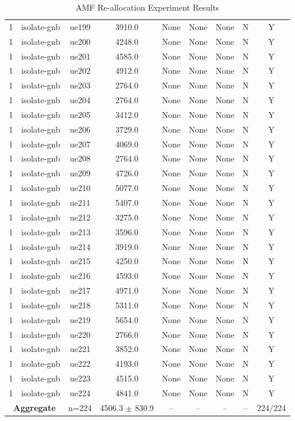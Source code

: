 \begin{table}[ht]
\begin{tabular}{|c|c|c|c|c|c|c|c|c|}
1 & isolate-gnb & ue199 & 3910.0 & None & None & None & N & Y \\
1 & isolate-gnb & ue200 & 4248.0 & None & None & None & N & Y \\
1 & isolate-gnb & ue201 & 4585.0 & None & None & None & N & Y \\
1 & isolate-gnb & ue202 & 4912.0 & None & None & None & N & Y \\
1 & isolate-gnb & ue203 & 2764.0 & None & None & None & N & Y \\
1 & isolate-gnb & ue204 & 2764.0 & None & None & None & N & Y \\
1 & isolate-gnb & ue205 & 3412.0 & None & None & None & N & Y \\
1 & isolate-gnb & ue206 & 3729.0 & None & None & None & N & Y \\
1 & isolate-gnb & ue207 & 4069.0 & None & None & None & N & Y \\
1 & isolate-gnb & ue208 & 2764.0 & None & None & None & N & Y \\
1 & isolate-gnb & ue209 & 4726.0 & None & None & None & N & Y \\
1 & isolate-gnb & ue210 & 5077.0 & None & None & None & N & Y \\
1 & isolate-gnb & ue211 & 5407.0 & None & None & None & N & Y \\
1 & isolate-gnb & ue212 & 3275.0 & None & None & None & N & Y \\
1 & isolate-gnb & ue213 & 3596.0 & None & None & None & N & Y \\
1 & isolate-gnb & ue214 & 3919.0 & None & None & None & N & Y \\
1 & isolate-gnb & ue215 & 4250.0 & None & None & None & N & Y \\
1 & isolate-gnb & ue216 & 4593.0 & None & None & None & N & Y \\
1 & isolate-gnb & ue217 & 4971.0 & None & None & None & N & Y \\
1 & isolate-gnb & ue218 & 5311.0 & None & None & None & N & Y \\
1 & isolate-gnb & ue219 & 5654.0 & None & None & None & N & Y \\
1 & isolate-gnb & ue220 & 2766.0 & None & None & None & N & Y \\
1 & isolate-gnb & ue221 & 3852.0 & None & None & None & N & Y \\
1 & isolate-gnb & ue222 & 4193.0 & None & None & None & N & Y \\
1 & isolate-gnb & ue223 & 4515.0 & None & None & None & N & Y \\
1 & isolate-gnb & ue224 & 4841.0 & None & None & None & N & Y \\
\multicolumn{2}{|c|}{\textbf{Aggregate}} & n=224 & 4506.3 $\pm$ 830.9 & -- & -- & -- & -- & 224/224 \\
\hline
\end{tabular}
\caption{AMF Re-allocation Experiment Results}
\label{tab:amf_realloc}
\end{table}
